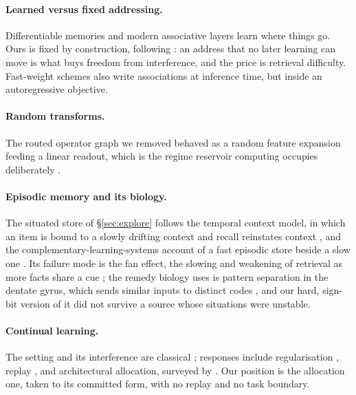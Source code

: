 \documentclass[11pt,a4paper]{article}
\theoremstyle{plain}
\theoremstyle{definition}
\theoremstyle{remark}
\begin{document}
\paragraph{Learned versus fixed addressing.} Differentiable memories
\citep{graves2014neural,graves2016hybrid,weston2015memory} and modern
associative layers \citep{ramsauer2021hopfield} learn where things go. Ours is
fixed by construction, following \citet{yang_2026_22161096}: an address that no
later learning can move is what buys freedom from interference, and the price is
retrieval difficulty. Fast-weight schemes
\citep{schmidhuber1992learning,ba2016using} also write associations at inference
time, but inside an autoregressive objective.

\paragraph{Random transforms.} The routed operator graph we removed behaved as a
random feature expansion \citep{rahimi2007random} feeding a linear readout,
which is the regime reservoir computing occupies deliberately
\citep{jaeger2001echo,maass2002real}.

\paragraph{Episodic memory and its biology.} The situated store of
\S\ref{sec:explore} follows the temporal context model, in which an item is
bound to a slowly drifting context and recall reinstates context
\citep{howard2002distributed}, and the complementary-learning-systems account of
a fast episodic store beside a slow one \citep{mcclelland1995complementary}. Its
failure mode is the fan effect, the slowing and weakening of retrieval as more
facts share a cue \citep{anderson1974retrieval}; the remedy biology uses is
pattern separation in the dentate gyrus, which sends similar inputs to
distinct codes \citep{yassa2011pattern}, and our hard, sign-bit version of it did
not survive a source whose situations were unstable.

\paragraph{Continual learning.} The setting and its interference are classical
\citep{mccloskey1989catastrophic,french1999catastrophic}; responses include
regularisation \citep{kirkpatrick2017overcoming}, replay
\citep{lopez2017gradient}, and architectural allocation, surveyed by
\citet{parisi2019continual}. Our position is the allocation one, taken to its
committed form, with no replay and no task boundary.
\end{document}
